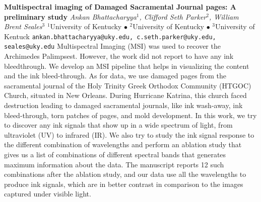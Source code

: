 
    \begin{conf-abstract}[]
        {\textbf{Multispectral imaging of Damaged Sacramental Journal pages: A preliminary study}}
        {\textit{Ankan Bhattacharyya$^{1}$, Clifford Seth Parker$^{2}$, William Brent Seales$^{3}$}}
        {$^{1}$University of Kentucky $\bullet$ $^{2}$University of Kentucky $\bullet$ $^{3}$University of Kentuck}
        {\texttt{ankan.bhattacharyya@uky.edu, c.seth.parker@uky.edu, seales@uky.edu}}
        {Multispectral Imaging (MSI) was used to recover the Archimedes Palimpsest. However, the work did not report to have any ink bleedthrough. We develop an MSI pipeline that helps in visualizing the content and the ink bleed-through. As for data, we use damaged pages from the sacramental journal of the Holy Trinity Greek Orthodox Community (HTGOC) Church, situated in New Orleans. During Hurricane Katrina, this church faced destruction leading to damaged sacramental journals, like ink wash-away, ink bleed-through, torn patches of pages, and mold development. In this work, we try to discover any ink signals that show up in a wide spectrum of light, from ultraviolet (UV) to infrared (IR). We also try to study the ink signal response to the different combination of wavelengths and perform an ablation study that gives us a list of combinations of different spectral bands that generates maximum information about the data. The manuscript reports 12 such combinations after the ablation study, and our data use all the wavelengths to produce ink signals, which are in better contrast in comparison to the images captured under visible light.}
    \end{conf-abstract}
        